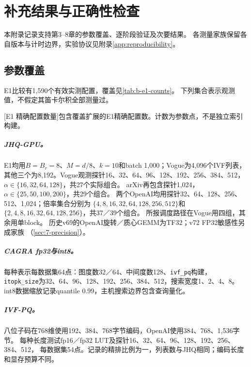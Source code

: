\chapter{补充结果与正确性检查}
\label{app:supplementary}
本附录记录支持第3--8章的参数覆盖、逐阶段验证及次要结果。
各测量家族保留各自版本与计时边界，实验协议见附录\ref{app:reproducibility}。

\section{参数覆盖}
\label{sec:b-grids}
E1比较有1,590个有效实测配置，覆盖见\cref{tab:b-e1-counts}。
下列集合表示观测值，不假定其笛卡尔积全部测量过。

\par\medskip\noindent\begin{minipage}{\linewidth}
\centering\captionsetup{hypcap=false}
[E1 精确配置数量]{包含覆盖扩展的E1精确配置数。计数为参数点，不是独立索引构建。}
\label{tab:b-e1-counts}
\footnotesize\setlength{\tabcolsep}{4pt}

\end{minipage}\par\medskip

\paragraph{JHQ-GPU。}
E1均用$B=B_r=8$、$M=d/8$、$k=10$和batch 1,000；Vogue为4,096个IVF列表，
其他三个为8,192。Vogue观测探针16、32、64、96、128、192、256、384、512，
$\alpha\in\{16,32,64,128\}$，共27个实际组合。
arXiv再包含探针1,024，$\alpha\in\{25,50,100,200\}$，共29个组合。
两个OpenAI均用探针32、64、128、256、512、1,024；倍率集合分别为
$\{4,8,16,32,64,128,256,512\}$和$\{2,4,8,16,32,64,128,256\}$，共37／39个组合。
所报调度路径在Vogue用四组，其余用单block。
历史v69的OpenAI旋转／质心GEMM为TF32；v72 FP32敏感性另成家族
（\cref{sec:7-precision}）。

\paragraph{CAGRA fp32与int8。}
每种表示每数据集64点：图度数32／64、中间度数128、\texttt{ivf\_pq}构建，
\texttt{itopk\_size}为32、64、96、128、192、256、384、512，搜索宽度1、2、4、8。
int8数据缩放记录quantile 0.99，主机搜索边界包含查询量化。

\paragraph{IVF-PQ。}
八位子码在768维使用192、384、768字节编码，OpenAI使用384、768、1,536字节。
每种长度测试fp16／fp32 LUT及探针16、32、64、96、128、192、256、384、512，
每数据集54点。记录的精排比例为一，列表数与JHQ相同；编码长度和显存预算不同。

